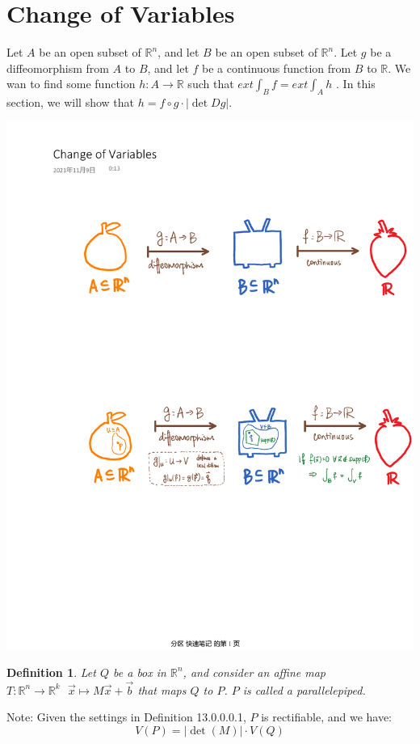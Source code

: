 \documentclass[15pt]{book}
\theoremstyle{break}
\theoremstyle{break}
\newtheorem{defn}{Definition}[corL]
\newcommand{\R}{\mathbb{R}}
\newcommand{\note}{\color{red}Note: \color{black}}
\begin{document}
\newpage
\section[Change of Variables]{\color{red} Change of Variables \color{black}}

Let $A$ be an open subset of $\R^n$, and let $B$ be an open subset of $\R^n$. Let $g$ be a diffeomorphism from $A$ to $B$, and let $f$ be a continuous function from $B$ to $\R$. We wan to find some function $h:A \to \R$ such that $ext \int_B f = ext \int_A h$ . In this section, we will show that $h = f\circ g \cdot |\det Dg|$.\\
\begin{center}
\includegraphics[scale=0.69]{chngOfVar.pdf}
\end{center}

\begin{defn}
Let $Q$ be a box in $\R^n$, and consider an affine map $T:\R^n \to \R^k \ \ \ \vec{x}\mapsto M\vec{x}+\vec{b}$ that maps $Q$ to $P$. $P$ is called a parallelepiped.  
\end{defn}
\note Given the settings in Definition 13.0.0.0.1, $P$ is rectifiable, and we have: $$V(P) = |\det(M)| \cdot V(Q)$$
\end{document}
